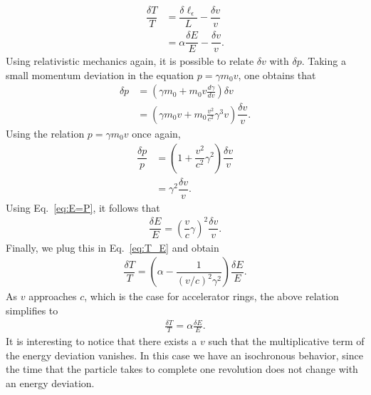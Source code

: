 \documentclass[../sands-adaptation.tex]{subfiles}
\begin{document}
\begin{align}\label{eq:T_E}
	\dfrac{\delta T}{T} &= \dfrac{\delta \ell_\epsilon}{L} - \dfrac{\delta v}{v}\\
    					&= \alpha \dfrac{\delta E}{E} - \dfrac{\delta v}{v}.
\end{align}
Using relativistic mechanics again, it is possible to relate $\delta v$ with $\delta p$. Taking a small momentum deviation in the equation $p = \gamma m_0 v$, one obtains that
\begin{align*}
	\delta p &= \left(\gamma m_0 + m_0 v \frac{d\gamma}{dv}\right)\delta v\\
    		&= \left(\gamma m_0 v + m_0 \frac{v^2}{c^2} \gamma^3 v \right) \dfrac{\delta v}{v}.
\end{align*}
Using the relation $p = \gamma m_0 v$ once again,
\begin{align*}
	\dfrac{\delta p}{p} &= \left( 1 + \dfrac{v^2}{c^2}\gamma^2 \right) \dfrac{\delta v}{v}\\
    					&= \gamma^2 \dfrac{\delta v}{v}.
\end{align*}
Using Eq.~\eqref{eq:E=P}, it follows that
\begin{align}
	\dfrac{\delta E}{E} = \left( \dfrac{v}{c}\gamma \right)^2 \dfrac{\delta v}{v}.
\end{align}
Finally, we plug this in Eq.~\eqref{eq:T_E} and obtain
\begin{align}
	\dfrac{\delta T}{T} = \left( \alpha - \dfrac{1}{(v/c)^2\gamma^2} \right)\dfrac{\delta E}{E}.
\end{align}
As $v$ approaches $c$, which is the case for accelerator rings, the above relation simplifies to
\begin{align} \label{eq:3.15}
\frac{\delta T}{T} = \alpha \frac{\delta E}{E}.
\end{align}
It is interesting to notice that there exists a $v$ such that the multiplicative term of the energy deviation vanishes. In this case we have an isochronous behavior, since the time that the particle takes to complete one revolution does not change with an energy deviation.
\end{document}
